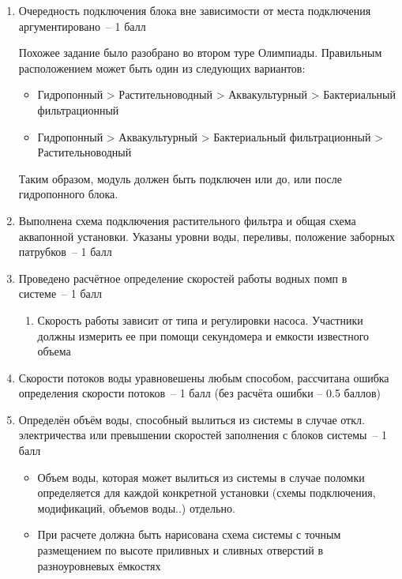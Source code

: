 \begin{enumerate}
    \item 	Очередность подключения блока вне зависимости от места подключения аргументировано~– 1 балл

    Похожее задание было разобрано во втором туре Олимпиады. Правильным расположением может быть один из следующих вариантов: 
        
        \begin{itemize}
            \item Гидропонный > Растительноводный > Аквакультурный  > Бактериальный фильтрационный
            \item Гидропонный >  Аквакультурный  > Бактериальный фильтрационный > Растительноводный
        \end{itemize}    
    Таким образом, модуль должен быть подключен или до, или после гидропонного блока. 
    
    \item  	Выполнена схема подключения растительного фильтра и общая схема аквапонной установки. Указаны уровни воды, переливы, положение заборных патрубков~– 1 балл

    \item  	Проведено расчётное определение скоростей работы водных помп в системе~– 1 балл
            \begin{enumerate}
                \item Скорость работы зависит от типа и регулировки насоса. Участники должны измерить ее при помощи секундомера и емкости известного объема
            \end{enumerate}

    \item 	Скорости потоков воды уравновешены любым способом, рассчитана ошибка определения скорости потоков~– 1 балл (без расчёта ошибки – 0.5 баллов)
    
    \item   Определён объём воды, способный вылиться из системы в случае откл. электричества или превышении скоростей заполнения с блоков системы~– 1 балл 
        \begin{itemize}        
                \item Объем воды, которая может вылиться из системы в случае поломки определяется для каждой конкретной установки (схемы подключения, модификаций, объемов воды..) отдельно.
            
                \item  При расчете должна быть нарисована схема системы с точным размещением по высоте приливных и сливных отверстий в разноуровневых ёмкостях
            

\end{itemize}
\end{enumerate}
